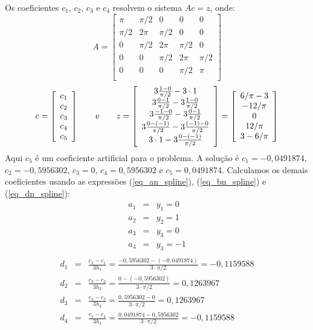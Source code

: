 Os coeficientes $c_1$, $c_2$, $c_3$ e $c_4$ resolvem o sistema $Ac = z$, onde:
\begin{equation*}
A=\left[\begin{array}{ccccc}
\pi &\pi/2&0&0&0 \\
\pi/2&2\pi&\pi/2&0&0\\
0&\pi/2&2\pi&\pi/2&0\\
0&0&\pi/2&2\pi&\pi/2\\
0&0&0&\pi/2&\pi\\
\end{array}\right]  
\end{equation*}
\begin{equation*}
c = \left[\begin{array}{c}
c_1\\
c_2\\
c_3\\
c_4\\
c_5
\end{array}\right]\qquad \hbox{e}\qquad
z = \left[\begin{array}{c}
3\frac{1-0}{\pi/2}-3\cdot 1\\
3\frac{0-1}{\pi/2}-3\frac{1-0}{\pi/2}\\
3\frac{-1-0}{\pi/2}-3\frac{0-1}{\pi/2}\\
3\frac{0-(-1)}{\pi/2}-3\frac{(-1)-0}{\pi/2}\\
3\cdot 1-3\frac{0-(-1)}{\pi/2}
\end{array}\right]=\left[\begin{array}{c}
6/\pi-3\\
-12/\pi\\
0\\
12/\pi\\
3-6/\pi
\end{array}\right]  
\end{equation*}
Aqui $c_5$ é um coeficiente artificial para o problema. A solução é  $c_1=-0,0491874$, $c_2=-0,5956302$, $c_3=0$, $c_4=0,5956302$ e $c_5=0,0491874$. Calculamos os demais coeficientes usando as expressões (\ref{eq_an_spline}), (\ref{eq_bn_spline}) e (\ref{eq_dn_spline}):
\begin{eqnarray*}
a_1&=&y_1=0\\
a_2&=&y_2=1\\
a_3&=&y_3=0\\
a_4&=&y_3=-1\\
\end{eqnarray*}
\begin{eqnarray*}
d_1&=&\frac{c_{2}-c_1}{3h_1}=\frac{-0,5956302-(-0,0491874)}{3\cdot \pi/2}=-0,1159588\\
d_2&=&\frac{c_{3}-c_2}{3h_2}=\frac{0-(-0,5956302)}{3\cdot \pi/2}=0,1263967\\
d_3&=&\frac{c_{4}-c_3}{3h_3}=\frac{0,5956302- 0}{3\cdot \pi/2}=0,1263967\\
d_4&=&\frac{c_{5}-c_4}{3h_4}=\frac{0,0491874- 0,5956302}{3\cdot \pi/2}=-0,1159588
\end{eqnarray*}
